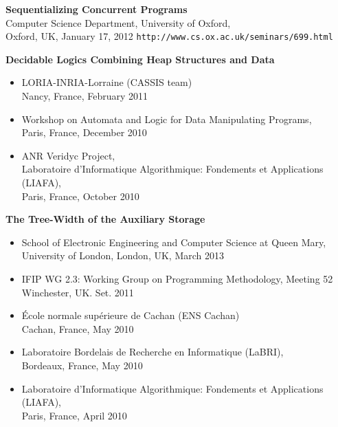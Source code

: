 \begin{resume}
{\bf Sequentializing Concurrent Programs}\\
Computer Science Department, University of Oxford,\\
Oxford, UK, January 17, 2012
{\tt http://www.cs.ox.ac.uk/seminars/699.html}


{\bf Decidable  Logics Combining Heap Structures and Data}\\
\begin{itemize}
\item 
LORIA-INRIA-Lorraine (CASSIS team)\\
Nancy, France, February 2011

\item
Workshop on Automata and Logic for Data Manipulating Programs,\\
Paris, France, December 2010

\item
ANR Veridyc Project,\\
Laboratoire d'Informatique Algorithmique: Fondements et Applications  (LIAFA), \\
Paris, France, October 2010



\end{itemize}


{\bf The Tree-Width of the Auxiliary Storage}\\
\begin{itemize}

\item 
School of Electronic Engineering and Computer Science at Queen Mary, University of London,
London, UK, March 2013

\item
IFIP WG 2.3: Working Group on Programming Methodology, Meeting 52\\ 
Winchester, UK. Set. 2011

\item 
\'Ecole normale sup\'erieure de Cachan (ENS Cachan)\\
Cachan, France, May 2010

\item Laboratoire Bordelais de Recherche en Informatique (LaBRI),\\ 
Bordeaux, France, May 2010
\item
Laboratoire d'Informatique Algorithmique: Fondements et Applications  (LIAFA), \\
Paris, France, April 2010

\end{itemize}


\end{resume}
